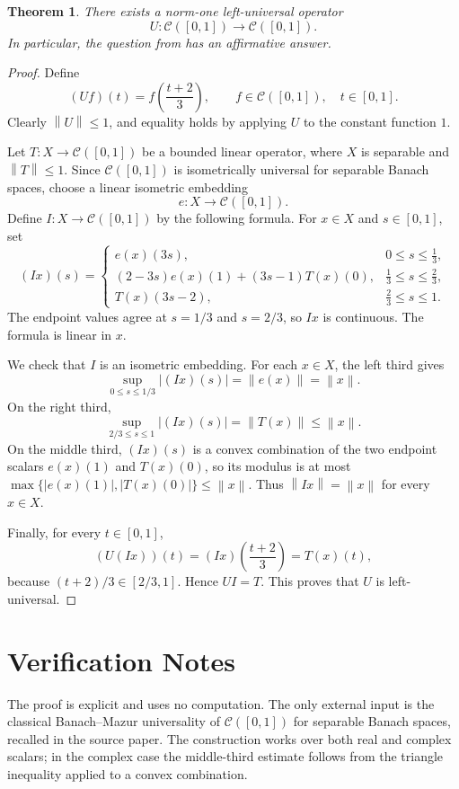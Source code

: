 \documentclass[11pt]{article}
\newtheorem{theorem}{Theorem}
\newcommand{\C}{\mathcal C}
\newcommand{\norm}[1]{\left\|#1\right\|}
\begin{document}
\begin{theorem}
There exists a norm-one left-universal operator
\[
  U:\C([0,1])\longrightarrow \C([0,1]).
\]
In particular, the question from \cite{GWK} has an affirmative answer.
\end{theorem}

\begin{proof}
Define
\[
  (Uf)(t)=f\!\left(\frac{t+2}{3}\right),
  \qquad f\in \C([0,1]),\quad t\in[0,1].
\]
Clearly \(\norm{U}\le 1\), and equality holds by applying \(U\) to the
constant function \(1\).

Let \(T:X\to \C([0,1])\) be a bounded linear operator, where \(X\) is separable
and \(\norm{T}\le 1\). Since \(\C([0,1])\) is isometrically universal for
separable Banach spaces, choose a linear isometric embedding
\[
   e:X\longrightarrow \C([0,1]).
\]
Define \(I:X\to \C([0,1])\) by the following formula. For \(x\in X\) and
\(s\in[0,1]\), set
\[
(Ix)(s)=
\begin{cases}
 e(x)(3s), & 0\le s\le \frac13,\\[3pt]
 (2-3s)e(x)(1)+(3s-1)T(x)(0),
    & \frac13\le s\le \frac23,\\[3pt]
 T(x)(3s-2), & \frac23\le s\le 1.
\end{cases}
\]
The endpoint values agree at \(s=1/3\) and \(s=2/3\), so \(Ix\) is continuous.
The formula is linear in \(x\).

We check that \(I\) is an isometric embedding. For each \(x\in X\), the left
third gives
\[
   \sup_{0\le s\le 1/3}|(Ix)(s)|=\norm{e(x)}=\norm{x}.
\]
On the right third,
\[
   \sup_{2/3\le s\le 1}|(Ix)(s)|=\norm{T(x)}\le \norm{x}.
\]
On the middle third, \((Ix)(s)\) is a convex combination of the two endpoint
scalars \(e(x)(1)\) and \(T(x)(0)\), so its modulus is at most
\(\max\{|e(x)(1)|,|T(x)(0)|\}\le \norm{x}\). Thus \(\norm{Ix}=\norm{x}\) for
every \(x\in X\).

Finally, for every \(t\in[0,1]\),
\[
   (U(Ix))(t)
   = (Ix)\!\left(\frac{t+2}{3}\right)
   = T(x)(t),
\]
because \((t+2)/3\in[2/3,1]\). Hence \(UI=T\). This proves that \(U\) is
left-universal.
\end{proof}

\section*{Verification Notes}

The proof is explicit and uses no computation. The only external input is the
classical Banach--Mazur universality of \(\C([0,1])\) for separable Banach
spaces, recalled in the source paper. The construction works over both real
and complex scalars; in the complex case the middle-third estimate follows
from the triangle inequality applied to a convex combination.
\end{document}
